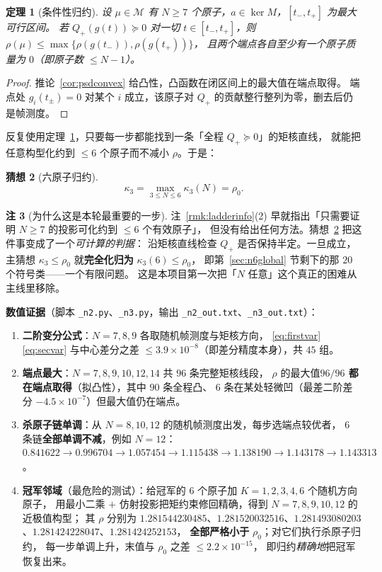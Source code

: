 \documentclass[UTF8,11pt]{ctexart}
\newtheorem{theorem}{定理}[section]
\newtheorem{conjecture}[theorem]{猜想}
\theoremstyle{definition}
\newtheorem{remark}[theorem]{注}
\begin{document}
\begin{theorem}[条件性归约]\label{thm:atomreduce}
设 $\mu\in\mathcal M$ 有 $N\ge7$ 个原子，$a\in\ker M$，$[t_-,t_+]$ 为最大可行区间。
若 $Q_+(g(t))\succeq0$ 对一切 $t\in[t_-,t_+]$，则
$\rho(\mu)\le\max\{\rho(g(t_-)),\rho(g(t_+))\}$，
且两个端点各自至少有一个原子质量为 $0$（即原子数 $\le N-1$）。
\end{theorem}

\begin{proof}
推论~\ref{cor:psdconvex} 给凸性，凸函数在闭区间上的最大值在端点取得。
端点处 $g_i(t_\pm)=0$ 对某个 $i$ 成立，该原子对 $Q_+$ 的贡献整行整列为零，删去后仍是帧测度。
\end{proof}

反复使用定理~\ref{thm:atomreduce}，只要每一步都能找到一条「全程 $Q_+\succeq0$」的矩核直线，
就能把任意构型化约到 $\le6$ 个原子而不减小 $\rho$。于是：

\begin{conjecture}[六原子归约]\label{conj:sixatom}
\[
\kappa_3=\max_{3\le N\le6}\kappa_3(N)=\rho_0 .
\]
\end{conjecture}

\begin{remark}[为什么这是本轮最重要的一步]\label{rmk:reducepayoff}
注~\ref{rmk:ladderinfo}(2) 早就指出「只需要证明 $N\ge7$ 的投影可化约到 $\le6$ 个有效原子」，
但没有给出任何方法。猜想~\ref{conj:sixatom} 把这件事变成了一个\emph{可计算的判据}：
沿矩核直线检查 $Q_+$ 是否保持半定。一旦成立，
主猜想 $\kappa_3\le\rho_0$ 就\textbf{完全化归为} $\kappa_3(6)\le\rho_0$，
即第~\ref{sec:n6global} 节剩下的那 $20$ 个符号类——一个有限问题。
这是本项目第一次把「$N$ 任意」这个真正的困难从主线里移除。
\end{remark}

\textbf{数值证据}（脚本 \texttt{\_n2.py}、\texttt{\_n3.py}，输出 \texttt{\_n2\_out.txt}、\texttt{\_n3\_out.txt}）：
\begin{enumerate}[label=(\alph*),leftmargin=2.2em]
\item \textbf{二阶变分公式}：$N=7,8,9$ 各取随机帧测度与矩核方向，
\eqref{eq:firstvar}\eqref{eq:secvar} 与中心差分之差 $\le3.9\times10^{-8}$（即差分精度本身），共 $45$ 组。
\item \textbf{端点最大}：$N=7,8,9,10,12,14$ 共 $96$ 条完整矩核线段，
$\rho$ 的最大值\textbf{$96/96$ 都在端点取得}（拟凸性），其中 $90$ 条全程凸、
$6$ 条在某处轻微凹（最差二阶差分 $-4.5\times10^{-7}$）但最大值仍在端点。
\item \textbf{杀原子链单调}：从 $N=8,10,12$ 的随机帧测度出发，每步选端点较优者，
$6$ 条链\textbf{全部单调不减}，例如 $N=12$：$0.841622\to0.996704\to1.057454\to1.115438\to1.138190\to1.143178\to1.143313$。
\item \textbf{冠军邻域}（最危险的测试）：给冠军的 $6$ 个原子加 $K=1,2,3,4,6$ 个随机方向原子，
用最小二乘 $+$ 仿射投影把矩约束修回精确，得到 $N=7,8,9,10,12$ 的近极值构型；
其 $\rho$ 分别为 $1.281544230485$、$1.281520032516$、$1.281493080203$、$1.281424228047$、$1.281424252153$，
\textbf{全部严格小于} $\rho_0$；对它们执行杀原子归约，
每一步单调上升，末值与 $\rho_0$ 之差 $\le2.2\times10^{-15}$，
即归约\emph{精确地}把冠军恢复出来。
\end{enumerate}
\end{document}
